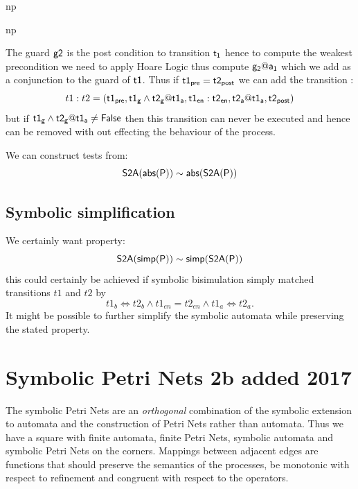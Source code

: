 \documentclass[]{article}
\begin{document}


\begin{center}\begin{minipage}{0.75\textwidth}
{{\sf np }}
\end{minipage}
\qquad
\begin{minipage}{0.75\textwidth}
{{\sf np }}
\end{minipage}\end{center}


The guard ${\sf g2}$ is the post condition to transition ${\sf t_1}$ hence to compute the weakest precondition we need to apply Hoare Logic thus compute ${\sf g_2@a_1}$  which we add as a conjunction to the guard of ${\sf t1}$.  Thus  if ${\sf t1_{pre} = t2_{post}}$   we can add the transition :
\[t1: t2 = \sf (t1_{pre}, t1_g\land t2_g@t1_a , t1_{en}:t2_{en}, t2_a@t1_a, t2_{post})\]
but if  ${\sf t1_g\land t2_g@t1_a\neq False}$ then this transition can never be executed and hence can be removed with out effecting the behaviour of the process.

We can construct tests from:
\[{\sf S2A(abs(P))\sim abs(S2A(P))}\]



\subsection{Symbolic simplification}
We certainly want property:
\[{\sf S2A(simp(P))\sim simp(S2A(P))}\]
this could certainly be achieved if symbolic bisimulation simply matched transitions $t1$ and $t2$ by
\[t1_b\Leftrightarrow t2_b \land t1_{en}= t2_{en} \land t1_a\Leftrightarrow t2_a.\]
It might be possible to further simplify the symbolic automata while preserving the stated property.


\section{Symbolic Petri Nets {\color{red} 2b added 2017}}


The symbolic Petri Nets  are an \emph{orthogonal} combination of the symbolic extension to automata and the construction of Petri Nets rather than automata. Thus we have a square with finite automata, finite Petri Nets, symbolic automata and symbolic Petri Nets on the corners. Mappings between adjacent edges  are functions that should preserve the semantics of the processes, be monotonic with respect to refinement and congruent with respect to the operators.
\end{document}
